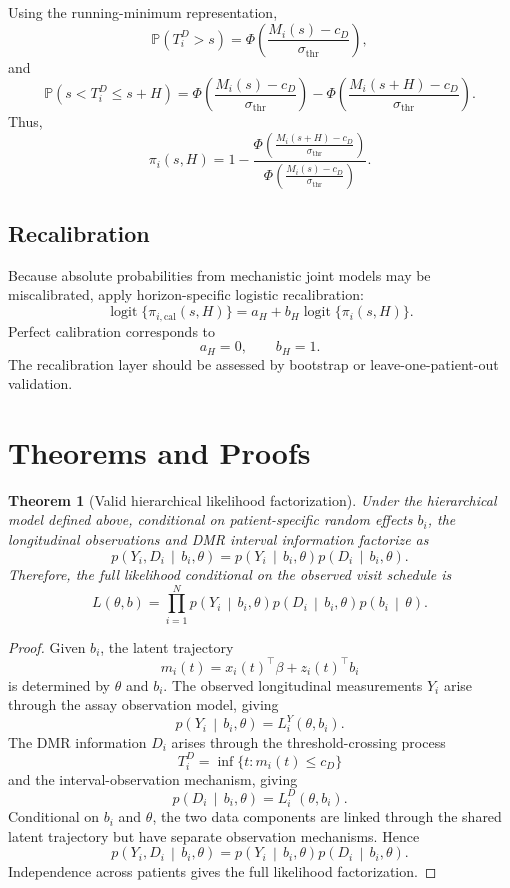 \documentclass[11pt]{article}
\newtheorem{theorem}{Theorem}
\theoremstyle{remark}
\newcommand{\Prob}{\mathbb{P}}
\newcommand{\given}{\,\middle|\,}
\newcommand{\logit}{\operatorname{logit}}
\newcommand{\PhiStd}{\Phi}
\begin{document}
Using the running-minimum representation,
\[
\Prob(T_i^D>s)
=
\PhiStd
\left(
\frac{M_i(s)-c_D}{\sigma_{\mathrm{thr}}}
\right),
\]
and
\[
\Prob(s<T_i^D\leq s+H)
=
\PhiStd
\left(
\frac{M_i(s)-c_D}{\sigma_{\mathrm{thr}}}
\right)
-
\PhiStd
\left(
\frac{M_i(s+H)-c_D}{\sigma_{\mathrm{thr}}}
\right).
\]
Thus,
\[
\pi_i(s,H)
=
1
-
\frac{
\PhiStd
\left(
\frac{M_i(s+H)-c_D}{\sigma_{\mathrm{thr}}}
\right)
}{
\PhiStd
\left(
\frac{M_i(s)-c_D}{\sigma_{\mathrm{thr}}}
\right)
}.
\]

\subsection{Recalibration}

Because absolute probabilities from mechanistic joint models may be miscalibrated, apply horizon-specific logistic recalibration:
\[
\logit\{\pi_{i,\mathrm{cal}}(s,H)\}
=
a_H+b_H\logit\{\pi_i(s,H)\}.
\]
Perfect calibration corresponds to
\[
a_H=0,
\qquad
b_H=1.
\]
The recalibration layer should be assessed by bootstrap or leave-one-patient-out validation.

\section{Theorems and Proofs}

\begin{theorem}[Valid hierarchical likelihood factorization]
Under the hierarchical model defined above, conditional on patient-specific random effects \(b_i\), the longitudinal observations and DMR interval information factorize as
\[
p(Y_i,D_i\given b_i,\theta)
=
p(Y_i\given b_i,\theta)
p(D_i\given b_i,\theta).
\]
Therefore, the full likelihood conditional on the observed visit schedule is
\[
L(\theta,b)
=
\prod_{i=1}^{N}
p(Y_i\given b_i,\theta)
p(D_i\given b_i,\theta)
p(b_i\given\theta).
\]
\end{theorem}

\begin{proof}
Given \(b_i\), the latent trajectory
\[
m_i(t)=x_i(t)^\top\beta+z_i(t)^\top b_i
\]
is determined by \(\theta\) and \(b_i\). The observed longitudinal measurements \(Y_i\) arise through the assay observation model, giving
\[
p(Y_i\given b_i,\theta)=L_i^Y(\theta,b_i).
\]
The DMR information \(D_i\) arises through the threshold-crossing process
\[
T_i^D=\inf\{t:m_i(t)\leq c_D\}
\]
and the interval-observation mechanism, giving
\[
p(D_i\given b_i,\theta)=L_i^D(\theta,b_i).
\]
Conditional on \(b_i\) and \(\theta\), the two data components are linked through the shared latent trajectory but have separate observation mechanisms. Hence
\[
p(Y_i,D_i\given b_i,\theta)
=
p(Y_i\given b_i,\theta)
p(D_i\given b_i,\theta).
\]
Independence across patients gives the full likelihood factorization.
\end{proof}
\end{document}
